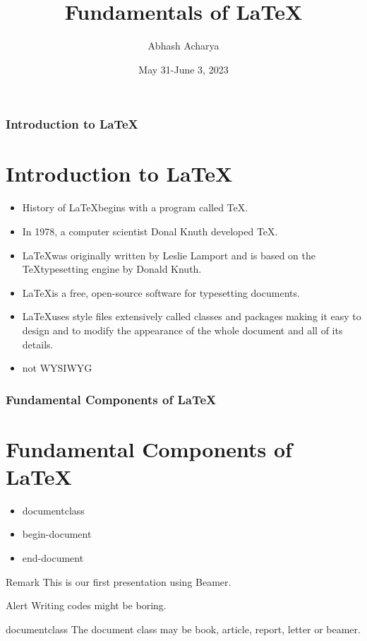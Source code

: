 \documentclass{beamer}
\title{Fundamentals of \LaTeX}
\author{Abhash Acharya}
\date {May 31-June 3, 2023}
\begin{document}
\maketitle
\begin{frame}
\frametitle{Introduction to \LaTeX}
\section{Introduction to \LaTeX}
\begin{itemize}
\item History of \LaTeX begins with a program called \TeX. \pause
\item In 1978, a computer scientist Donal Knuth developed \TeX. \pause
\item \LaTeX was originally written by Leslie Lamport \pause and is based on the \TeX typesetting engine by Donald Knuth. \pause
\item \LaTeX is a free, open-source software for typesetting documents. \pause
\item \LaTeX uses style files extensively called classes and packages making it easy to design and to modify the appearance of the whole document and all of its details. \pause
\item not WYSIWYG
\end{itemize}
\end{frame}
\begin{frame}
\frametitle{Fundamental Components of \LaTeX}
\section{Fundamental Components of \LaTeX}
\begin{itemize}
\item documentclass \pause
\item begin-document \pause
\item end-document 
\end{itemize}
\pause
\begin{block}{Remark}
This is our first presentation using Beamer.
\end{block}
\pause
\begin{alertblock} {Alert}
Writing codes might be boring.
\end{alertblock}
\pause
\begin{examples} {documentclass}
The document class may be book, article, report, letter or beamer.
\end{examples}
\end{frame}
\end{document}
